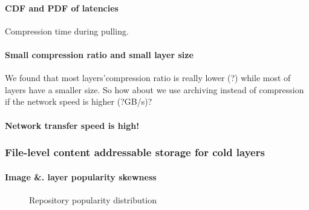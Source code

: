 \paragraph{CDF and PDF of latencies} 

Compression time during pulling. 

\paragraph{Small compression ratio and small layer size}





We found that most layers'compression ratio is really lower (?) while most of layers have a smaller size. 
So how about we use archiving instead of compression if the network speed is higher (?GB/s)?

\paragraph{Network transfer speed is high!}

\subsubsection{File-level content addressable storage for cold layers}

\paragraph{Image \&. layer popularity skewness} 

\begin{figure}[!t]
	\centering
	\caption{Repository popularity distribution}
	\label{fig-pop}
\end{figure}

